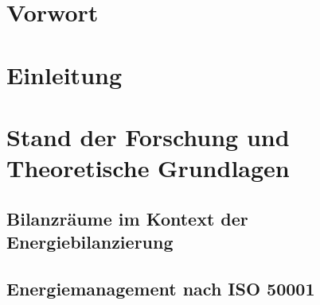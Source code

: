 \documentclass[a4paper,10pt,twoside]{report}
\begin{document}
\chapter*{Vorwort}
\tableofcontents

\chapter{Einleitung}
\setcounter{page}{1}














\chapter{Stand der Forschung und Theoretische Grundlagen}
\section{Bilanzräume im Kontext der Energiebilanzierung}



\section{Energiemanagement nach ISO 50001}







\end{document}
